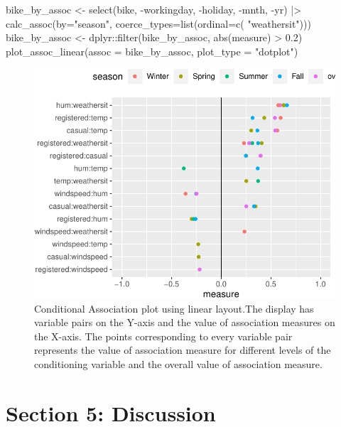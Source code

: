 \begin{Schunk}
\begin{Sinput}
bike_by_assoc <- select(bike, -workingday, -holiday, -mnth, -yr) |>
  calc_assoc(by="season", 
                  coerce_types=list(ordinal=c( "weathersit")))
bike_by_assoc <- dplyr::filter(bike_by_assoc, abs(measure) > 0.2)
plot_assoc_linear(assoc = bike_by_assoc,
                  plot_type = "dotplot")
\end{Sinput}
\begin{figure}

\includegraphics{rj_paper_files/figure-latex/linear-cond-assoc-1} \hfill{}

\caption[Conditional Association plot using linear layout.The display has variable pairs on the Y-axis and the value of association measures on the X-axis]{Conditional Association plot using linear layout.The display has variable pairs on the Y-axis and the value of association measures on the X-axis. The points corresponding to every variable pair represents the value of association measure for different levels of the conditioning variable and the overall value of association measure.}\label{fig:linear-cond-assoc}
\end{figure}
\end{Schunk}

\hypertarget{section-5-discussion}{%
\section{Section 5: Discussion}\label{section-5-discussion}}

